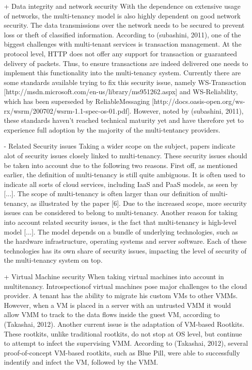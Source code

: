 + Data integrity and network security
With the dependence on extensive usage of networks, the multi-tenancy model is also highly dependent on good network security.  The data transmissions over the network needs to be secured to prevent loss or theft of classified information. According to (subashini, 2011), one of the biggest challenges with multi-tenant services is transaction management. At the protocol level, HTTP does not offer any support for transaction or guaranteed delivery of packets. Thus, to ensure transactions are indeed delivered one needs to implement this functionality into the multi-tenancy system.
	Currently there are some standards available trying to fix this security issue, namely WS-Transaction [http://msdn.microsoft.com/en-us/library/ms951262.aspx] and WS-Reliability, which has been superseded by ReliableMessaging [http://docs.oasis-open.org/ws-rx/wsrm/200702/wsrm-1.1-spec-os-01.pdf]. However, noted by (subashini, 2011), these standards haven’t reached technical maturity yet and have therefore yet to experience full adoption by the majority of the multi-tentancy providers.

- Related Security issues
Taking a wider scope on the subject, papers indicate alot of security issues closely linked to multi-tenancy. These security issues should be taken into account due to the following two reasons.
First off, as mentioned earlier, the definition of multi-tenancy is still quite ambiguous. It is often used to indicate all sorts of cloud services, including IaaS and PaaS models, as seen by [...]. The scope of multi-tenancy is often larger than our definition of multi-tenancy, as illustrated by the paper [6]. Due to the increased scope, more security issues can be considered to belong to multi-tenancy. 
Another reason for taking into account related security issues, is the fact that multi-tenancy is high-level model [...]. The model depends on a bundle of underlying technologies, such as the hardware infrastructure, operating systems and server software. Each of these technologies has its own share of security issues, impacting the level of security of the multi-tenancy system on top. 

+ Virtual Machine security
When taking virtual machines into account in multitenancy. Introspectionof virtual machines pose major challenges to the cloud provider. A tenant has the ability to migrate his custom VMs to other VMMs. However, when a VM is placed in a server with an untrusted VMM it would allow VMM to track to the data flows inside the guest VM, according to (Takashai, 2012). 
Another current issue is the adaptation of VM-based Rootkits. These rootkits, unlike traditional rootkits, do not stop at OS level, but continue to attempt to infect the supervising VMM. According to (Takashai, 2012), several proof-of-concept VM-based rootkits, such as Blue Pill, were able to successfully indentify and infect the VM, followed by the VMM.

